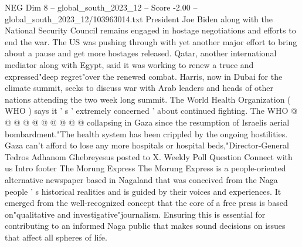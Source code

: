 \begin{textsample}{NEG Dim 8 – global\_south\_2023\_12 – Score -2.00 – global\_south\_2023\_12/103963014.txt}
President Joe Biden along with the National Security Council remains engaged in hostage negotiations and efforts to end the war.
The US was pushing through with yet another major effort to bring about a pause and get more hostages released.
Qatar, another international mediator along with Egypt, said it was working to renew a truce and expressed"deep regret"over the renewed combat.
Harris, now in Dubai for the climate summit, seeks to discuss war with Arab leaders and heads of other nations attending the two week long summit.
The World Health Organization ( WHO ) says it ' s ' extremely concerned ' about continued fighting.
The WHO @ @ @ @ @ @ @ @ @ @ collapsing in Gaza since the resumption of Israelis aerial bombardment."The health system has been crippled by the ongoing hostilities.
Gaza can't afford to lose any more hospitals or hospital beds,"Director-General Tedros Adhanom Ghebreyesus posted to X.
Weekly Poll Question Connect with us Intro footer The Morung Express The Morung Express is a people-oriented alternative newspaper based in Nagaland that was conceived from the Naga people ' s historical realities and is guided by their voices and experiences.
It emerged from the well-recognized concept that the core of a free press is based on"qualitative and investigative"journalism.
Ensuring this is essential for contributing to an informed Naga public that makes sound decisions on issues that affect all spheres of life.

\end{textsample}
